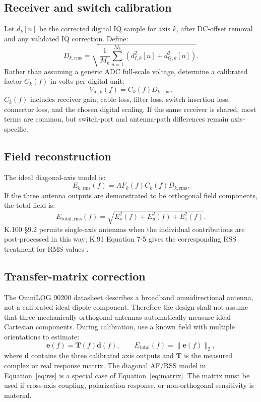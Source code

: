 \documentclass[11pt,a4paper]{article}
\begin{document}
\subsection{Receiver and switch calibration}
Let $d_k[n]$ be the corrected digital IQ sample for axis $k$, after DC-offset removal and any validated IQ correction. Define:
\begin{equation}
  D_{k,\mathrm{rms}}=
  \sqrt{\frac{1}{M_k}\sum_{n=1}^{M_k}
  \left(d_{I,k}^2[n]+d_{Q,k}^2[n]\right)}.
  \label{eq:digital-rms}
\end{equation}
Rather than assuming a generic ADC full-scale voltage, determine a calibrated factor $C_k(f)$ in volts per digital unit:
\begin{equation}
  V_{\mathrm{in},k}(f)=C_k(f)D_{k,\mathrm{rms}}.
  \label{eq:receiver-cal}
\end{equation}
$C_k(f)$ includes receiver gain, cable loss, filter loss, switch insertion loss, connector loss, and the chosen digital scaling. If the same receiver is shared, most terms are common, but switch-port and antenna-path differences remain axis-specific.

\subsection{Field reconstruction}
The ideal diagonal-axis model is:
\begin{equation}
  E_{k,\mathrm{rms}}(f)=AF_k(f)C_k(f)D_{k,\mathrm{rms}}.
  \label{eq:axis-field}
\end{equation}
If the three antenna outputs are demonstrated to be orthogonal field components, the total field is:
\begin{equation}
  E_{\mathrm{total,rms}}(f)=
  \sqrt{E_x^2(f)+E_y^2(f)+E_z^2(f)}.
  \label{eq:rss}
\end{equation}
K.100 §9.2 permits single-axis antennas when the individual contributions are post-processed in this way; K.91 Equation 7-5 gives the corresponding RSS treatment for RMS values \cite{ITU-T-K.100,ITU-T-K.91}.

\subsection{Transfer-matrix correction}
The OmniLOG 90200 datasheet describes a broadband omnidirectional antenna, not a calibrated ideal dipole component. Therefore the design shall not assume that three mechanically orthogonal antennas automatically measure ideal Cartesian components. During calibration, use a known field with multiple orientations to estimate:
\begin{equation}
  \bm{e}(f)=\bm{T}(f)\bm{d}(f),
  \qquad
  E_{\mathrm{total}}(f)=\|\bm{e}(f)\|_2,
  \label{eq:matrix}
\end{equation}
where $\bm{d}$ contains the three calibrated axis outputs and $\bm{T}$ is the measured complex or real response matrix. The diagonal AF/RSS model in Equation~\ref{eq:rss} is a special case of Equation~\ref{eq:matrix}. The matrix must be used if cross-axis coupling, polarization response, or non-orthogonal sensitivity is material.
\end{document}
